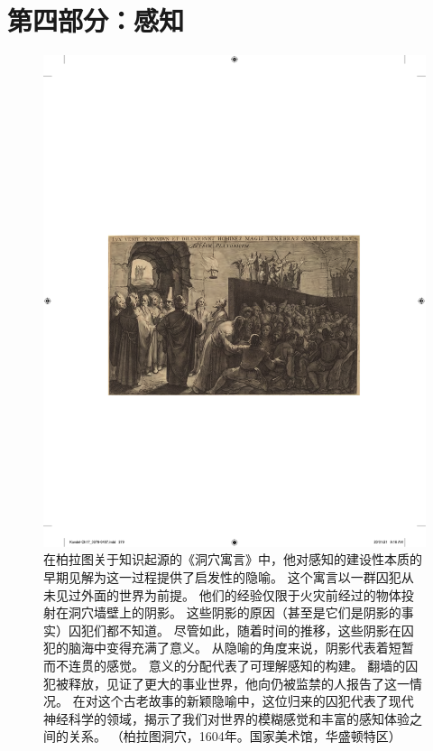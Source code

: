 \chapter*{第四部分：感知}

\begin{figure}[htbp]
	\centering
	\includegraphics[width=1.0\linewidth]{chap17/fig_17_0}
	\caption{在柏拉图关于知识起源的《洞穴寓言》中，他对感知的建设性本质的早期见解为这一过程提供了启发性的隐喻。
		这个寓言以一群囚犯从未见过外面的世界为前提。
		他们的经验仅限于火灾前经过的物体投射在洞穴墙壁上的阴影。
		这些阴影的原因（甚至是它们是阴影的事实）囚犯们都不知道。
		尽管如此，随着时间的推移，这些阴影在囚犯的脑海中变得充满了意义。
		从隐喻的角度来说，阴影代表着短暂而不连贯的感觉。
		意义的分配代表了可理解感知的构建。
		翻墙的囚犯被释放，见证了更大的事业世界，他向仍被监禁的人报告了这一情况。
		在对这个古老故事的新颖隐喻中，这位归来的囚犯代表了现代神经科学的领域，揭示了我们对世界的模糊感觉和丰富的感知体验之间的关系。
		（柏拉图洞穴，1604年。国家美术馆，华盛顿特区）}
	\label{fig:17_0}
\end{figure}

